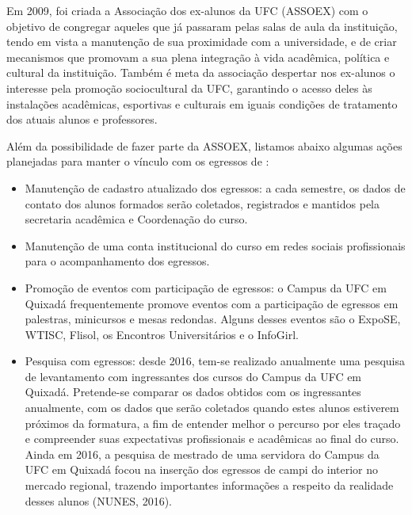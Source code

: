 Em 2009, foi criada a Associação dos ex-alunos da UFC (ASSOEX) com o objetivo de congregar aqueles que já passaram pelas salas de aula da instituição, tendo em vista a manutenção de sua proximidade com a universidade, e de criar mecanismos que promovam a sua plena integração à vida acadêmica, política e cultural da instituição. Também é meta da associação despertar nos ex-alunos o interesse pela promoção sociocultural da UFC, garantindo o acesso deles às instalações acadêmicas, esportivas e culturais em iguais condições de tratamento dos atuais alunos e professores.

Além da possibilidade de fazer parte da ASSOEX, listamos abaixo algumas ações planejadas para manter o vínculo com os egressos de \nomedocurso:

\begin{itemize}
    \item Manutenção de cadastro atualizado dos egressos: a cada semestre, os dados de contato dos alunos formados serão coletados, registrados e mantidos pela secretaria acadêmica e Coordenação do curso.
    
    \item Manutenção de uma conta institucional do curso em redes sociais profissionais para o acompanhamento dos egressos.
    
    \item Promoção de eventos com participação de egressos: o Campus da UFC em Quixadá frequentemente promove eventos com a participação de egressos em palestras, minicursos e mesas redondas. Alguns desses eventos são o ExpoSE, WTISC, Flisol, os Encontros Universitários e o InfoGirl.
    
    \item Pesquisa com egressos: desde 2016, tem-se realizado anualmente uma pesquisa de levantamento com ingressantes dos cursos do Campus da UFC em Quixadá. Pretende-se comparar os dados obtidos com os ingressantes anualmente, com os dados que serão coletados quando estes alunos estiverem próximos da formatura, a fim de entender melhor o percurso por eles traçado e compreender suas expectativas profissionais e acadêmicas ao final do curso. Ainda em 2016, a pesquisa de mestrado de uma servidora do Campus da UFC em Quixadá focou na inserção dos egressos de campi do interior no mercado regional, trazendo importantes informações a respeito da realidade desses alunos (NUNES, 2016).
\end{itemize}